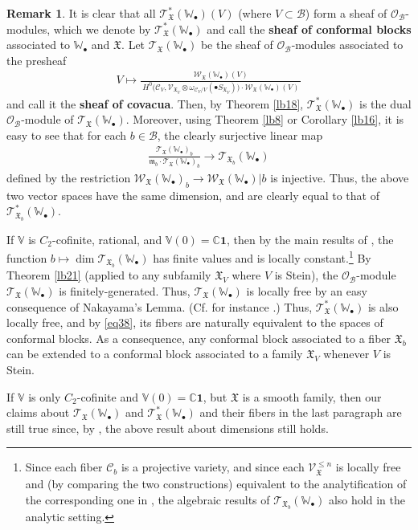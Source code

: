 \documentclass[11pt,b5paper,notitlepage]{article}
\theoremstyle{definition}
\newtheorem{rem}[df]{Remark}
\theoremstyle{plain}
\newcommand{\fk}{\mathfrak}
\newcommand{\mc}{\mathcal}
\newcommand{\id}{\mathbf{1}}
\newcommand{\scr}{\mathscr}
\newcommand{\blt}{\bullet}
\newcommand{\Vbb}{\mathbb V}
\newcommand{\Wbb}{\mathbb W}
\newcommand{\Cbb}{\mathbb C}
\numberwithin{equation}{section}
\begin{document}
\begin{rem}\label{lb22}
It is clear that all $\scr T_{\fk X}^*(\Wbb_\blt)(V)$ (where $V\subset\mc B$) form a sheaf of $\scr O_{\mc B}$-modules, which we denote by $\scr T_{\fk X}^*(\Wbb_\blt)$ \index{T@$\scr T_{\fk X}^*(\Wbb_\blt),\scr T_{\fk X}^*(\Wbb_\blt)(\mc B)$} and call the \textbf{sheaf of conformal blocks} associated to $\Wbb_\blt$ and $\fk X$. Let $\scr T_{\fk X}(\Wbb_\blt)$ be the sheaf of $\scr O_{\mc B}$-modules associated to the presheaf
\begin{align*}
V\mapsto \frac{\scr W_{\fk X}(\Wbb_\blt)(V)} {~H^0\big(\mc C_V,\scr V_{\fk X_V}\otimes\omega_{\mc C_V/V}(\blt S_{\fk X_V})\big)\cdot \scr W_{\fk X}(\Wbb_\blt)(V)~}
\end{align*}
and call it the \textbf{sheaf of covacua}. Then, by Theorem \ref{lb18}, $\scr T_{\fk X}^*(\Wbb_\blt)$ is the dual $\scr O_{\mc B}$-module of $\scr T_{\fk X}(\Wbb_\blt)$. Moreover, using Theorem \ref{lb8} or Corollary \ref{lb16}, it is easy to see that for each $b\in\mc B$, the clearly surjective linear map
\begin{align}
\frac{\scr T_{\fk X}(\Wbb_\blt)_b}{\fk m_b\cdot \scr T_{\fk X}(\Wbb_\blt)_b}\rightarrow\scr T_{\fk X_b}(\Wbb_\blt)\label{eq38}
\end{align}
defined by the restriction $\scr W_{\fk X}(\Wbb_\blt)_b\rightarrow \scr W_{\fk X}(\Wbb_\blt)|b$ is injective. Thus, the above two vector spaces have the same dimension, and are clearly equal to that of $\scr T_{\fk X_b}^*(\Wbb_\blt)$.

If $\Vbb$ is $C_2$-cofinite, rational, and $\Vbb(0)=\Cbb\id$, then by the main results of \cite{DGT19b}, the function $b\mapsto \dim\scr T_{\fk X_b}(\Wbb_\blt)$ has finite values and is locally constant.\footnote{Since each  fiber $\mc C_b$ is a projective variety, and since each $\scr V_{\fk X}^{\leq n}$ is locally free and (by comparing the two constructions) equivalent to the analytification of the corresponding one in \cite{DGT19a,DGT19b},  the algebraic results of $\scr T_{\fk X_b}(\Wbb_\blt)$ also hold in the analytic setting.} By Theorem \ref{lb21} (applied to any subfamily $\fk X_V$ where $V$ is Stein), the $\scr O_{\mc B}$-module $\scr T_{\fk X}(\Wbb_\blt)$ is finitely-generated. Thus, $\scr T_{\fk X}(\Wbb_\blt)$ is locally free by an easy consequence of Nakayama's Lemma. (Cf. for instance \cite[Lemma III.1.6]{BS76}.) Thus, $\scr T_{\fk X}^*(\Wbb_\blt)$ is also locally free, and by \eqref{eq38}, its fibers are naturally equivalent to the spaces of conformal blocks. As a consequence, any conformal block associated to a fiber $\fk X_b$ can be extended to a conformal block associated to a family $\fk X_V$ whenever $V$ is Stein.



If $\Vbb$ is only $C_2$-cofinite and $\Vbb(0)=\Cbb\id$, but $\fk X$ is a smooth family, then our claims about $\scr T_{\fk X}(\Wbb_\blt)$ and $\scr T_{\fk X}^*(\Wbb_\blt)$ and their fibers in the last paragraph are still true since,  by \cite{DGT19b}, the above result about dimensions still holds. 
\end{rem}
\end{document}
